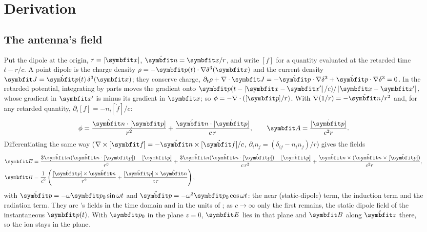 \documentclass{leveldoc}
\begin{document}
\section{Derivation}\label{sec:derivation}

\subsection{The antenna's field}\label{sec:field}

Put the dipole at the origin, $r = \abs{\vect{x}}$, $\uvec{n} = \vect{x}/r$, and write $[f]$ for
a quantity evaluated at the retarded time $t - r/c$. A point dipole is the charge density
$\rho = -\vect{p}(t)\cdot\nabla\delta^3(\vect{x})$ and the current density
$\vect{J} = \dot{\vect{p}}(t)\,\delta^3(\vect{x})$; they conserve charge,
$\partial_t\rho + \nabla\cdot\vect{J} = -\dot{\vect{p}}\cdot\nabla\delta^3 + \dot{\vect{p}}\cdot\nabla\delta^3 = 0$.
In the retarded potential, integrating by parts moves the gradient onto
$\vect{p}(t - \abs{\vect{x}-\vect{x}'}/c)/\abs{\vect{x}-\vect{x}'}$, whose gradient in
$\vect{x}'$ is minus its gradient in $\vect{x}$; so $\phi = -\nabla\cdot([\vect{p}]/r)$. With
$\nabla(1/r) = -\uvec{n}/r^2$ and, for any retarded quantity, $\partial_i[f] = -n_i[\dot f]/c$:
\begin{equation}\label{eq:potentials}
  \phi = \frac{\uvec{n}\cdot[\vect{p}]}{r^2} + \frac{\uvec{n}\cdot[\dot{\vect{p}}]}{c\,r},
  \qquad
  \vect{A} = \frac{[\dot{\vect{p}}]}{c^2 r}.
\end{equation}
Differentiating the same way ($\nabla\times[\vect{f}] = -\uvec{n}\times[\dot{\vect{f}}]/c$,
$\partial_i n_j = (\delta_{ij} - n_in_j)/r$) gives the fields
\begin{align}
  \vect{E} &= \frac{3\uvec{n}(\uvec{n}\cdot[\vect{p}]) - [\vect{p}]}{r^3}
    + \frac{3\uvec{n}(\uvec{n}\cdot[\dot{\vect{p}}]) - [\dot{\vect{p}}]}{c\,r^2}
    + \frac{\uvec{n}\times(\uvec{n}\times[\ddot{\vect{p}}])}{c^2 r}, \label{eq:fields}\\
  \vect{B} &= \frac{1}{c^2}\left(\frac{[\dot{\vect{p}}]\times\uvec{n}}{r^2}
    + \frac{[\ddot{\vect{p}}]\times\uvec{n}}{c\,r}\right), \nonumber
\end{align}
with $\dot{\vect{p}} = -\omega\vect{p}_0\sin\omega t$ and
$\ddot{\vect{p}} = -\omega^2\vect{p}_0\cos\omega t$: the near (static-dipole) term, the
induction term and the radiation term. They are 's fields in the time domain and in
the units of ; as $c\to\infty$ only the first remains, the
static dipole field of the instantaneous $\vect{p}(t)$. With $\vect{p}_0$ in the plane $z = 0$,
$\vect{E}$ lies in that plane and $\vect{B}$ along $\uvec{z}$ there, so the ion stays in the
plane.
\end{document}

